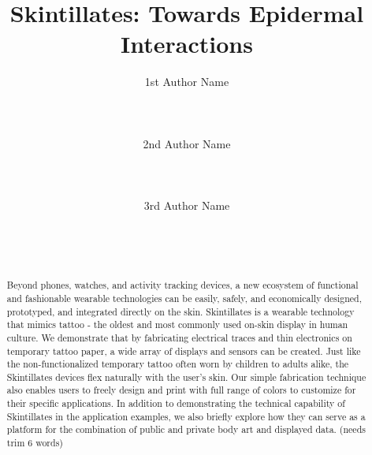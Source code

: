 \documentclass{sigchi}
\begin{document}
\title{Skintillates: Towards Epidermal Interactions}

\author{
  \alignauthor 1st Author Name\\
    \\
    \\
    \\
  \alignauthor 2nd Author Name\\
    \\
    \\
    \\
  \alignauthor 3rd Author Name\\
    \\
    \\
    \\
}

\maketitle

\begin{abstract}
Beyond phones, watches, and activity tracking devices, a new ecosystem of functional and fashionable wearable technologies can be easily, safely, and economically designed, prototyped, and integrated directly on the skin. Skintillates is a wearable technology that mimics tattoo - the oldest and most commonly used on-skin display in human culture. We demonstrate that by fabricating electrical traces and thin electronics on temporary tattoo paper, a wide array of displays and sensors can be created. Just like the non-functionalized temporary tattoo often worn by children to adults alike, the Skintillates devices flex naturally with the user's skin. Our simple fabrication technique also enables users to freely design and print with full range of colors to customize for their specific applications. In addition to demonstrating the technical capability of Skintillates in the application examples, we also briefly explore how they can serve as a platform for the combination of public and private body art and displayed data. (needs trim 6 words)
\end{abstract}

\end{document}
